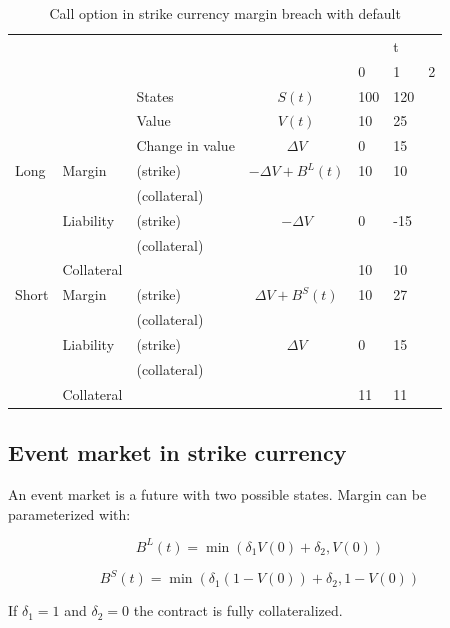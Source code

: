 \documentclass[12pt]{article}
\begin{document}
\begin{table}
\begin{tabular}{lll|c|lll}
&  &  &  &  & t &\\  
&  &  &  & 0 & 1 & 2\\
\hline
&  & States &  $S(t)$ & 100 & 120 & \\
&  & Value  &  $V(t)$  & 10 & 25 &  \\
&  & Change in value & $\Delta V$ & 0& 15 &  \\
\hline
\hline
Long      & Margin    & (strike)     & $-\Delta V + B^L(t)$& 10 & 10 & \\
          &           & (collateral) & & & &\\ 
          & Liability & (strike)     & $-\Delta V$ & 0 & -15 & \\ 
          &           & (collateral)& & & &\\
          & Collateral&                       &    & 10 & 10 & \\
\hline          
Short     & Margin    & (strike)     & $\Delta V + B^S(t)$ & 10 & 27 & \\
          &           & (collateral) & & & &\\
          & Liability & (strike)     & $\Delta V$ & 0 & 15 &\\
          &           & (collateral) & & & &\\
          & Collateral&                       &    & 11 & 11 & \\ 
          

\end{tabular}
\caption{Call option in strike currency margin breach with default}
\label{fut}
\end{table}

\subsection{Event market in strike currency}

An event market is a future with two possible states. Margin can be parameterized with:


\[ B^L(t) = \min(\delta_1 V(0) + \delta_2, V(0) ) \]

\[ B^S(t) = \min(\delta_1 (1-V(0)) + \delta_2, 1-V(0) ) \]

If $\delta_1=1$ and $\delta_2=0$ the contract is fully collateralized.
\end{document}
